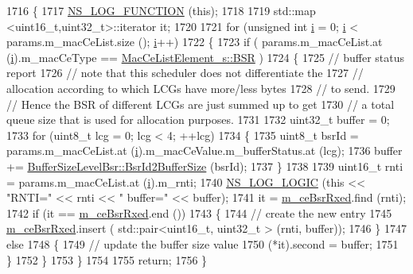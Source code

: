 \begin{DoxyCode}
1716 \{
1717   \hyperlink{log-macros-disabled_8h_a90b90d5bad1f39cb1b64923ea94c0761}{NS\_LOG\_FUNCTION} (\textcolor{keyword}{this});
1718 
1719   std::map <uint16\_t,uint32\_t>::iterator it;
1720 
1721   \textcolor{keywordflow}{for} (\textcolor{keywordtype}{unsigned} \textcolor{keywordtype}{int} \hyperlink{bernuolliDistribution_8m_a6f6ccfcf58b31cb6412107d9d5281426}{i} = 0; \hyperlink{bernuolliDistribution_8m_a6f6ccfcf58b31cb6412107d9d5281426}{i} < params.m\_macCeList.size (); \hyperlink{bernuolliDistribution_8m_a6f6ccfcf58b31cb6412107d9d5281426}{i}++)
1722     \{
1723       \textcolor{keywordflow}{if} ( params.m\_macCeList.at (\hyperlink{bernuolliDistribution_8m_a6f6ccfcf58b31cb6412107d9d5281426}{i}).m\_macCeType == \hyperlink{structns3_1_1MacCeListElement__s_a270a6526dfc7da02e9dc91823c290f6bac50796b01160b1825ec34efa1ad9f051}{MacCeListElement\_s::BSR} )
1724         \{
1725           \textcolor{comment}{// buffer status report}
1726           \textcolor{comment}{// note that this scheduler does not differentiate the}
1727           \textcolor{comment}{// allocation according to which LCGs have more/less bytes}
1728           \textcolor{comment}{// to send.}
1729           \textcolor{comment}{// Hence the BSR of different LCGs are just summed up to get}
1730           \textcolor{comment}{// a total queue size that is used for allocation purposes.}
1731 
1732           uint32\_t buffer = 0;
1733           \textcolor{keywordflow}{for} (uint8\_t lcg = 0; lcg < 4; ++lcg)
1734             \{
1735               uint8\_t bsrId = params.m\_macCeList.at (\hyperlink{bernuolliDistribution_8m_a6f6ccfcf58b31cb6412107d9d5281426}{i}).m\_macCeValue.m\_bufferStatus.at (lcg);
1736               buffer += \hyperlink{classns3_1_1BufferSizeLevelBsr_a67fc905f267ed8ac5a617fe229699122}{BufferSizeLevelBsr::BsrId2BufferSize} (bsrId);
1737             \}
1738           
1739           uint16\_t rnti = params.m\_macCeList.at (\hyperlink{bernuolliDistribution_8m_a6f6ccfcf58b31cb6412107d9d5281426}{i}).m\_rnti;
1740           \hyperlink{group__logging_ga88acd260151caf2db9c0fc84997f45ce}{NS\_LOG\_LOGIC} (\textcolor{keyword}{this} << \textcolor{stringliteral}{"RNTI="} << rnti << \textcolor{stringliteral}{" buffer="} << buffer);
1741           it = \hyperlink{classns3_1_1TdMtFfMacScheduler_a06bec792095027e46fcf5281e4f4e77a}{m\_ceBsrRxed}.find (rnti);
1742           \textcolor{keywordflow}{if} (it == \hyperlink{classns3_1_1TdMtFfMacScheduler_a06bec792095027e46fcf5281e4f4e77a}{m\_ceBsrRxed}.end ())
1743             \{
1744               \textcolor{comment}{// create the new entry}
1745               \hyperlink{classns3_1_1TdMtFfMacScheduler_a06bec792095027e46fcf5281e4f4e77a}{m\_ceBsrRxed}.insert ( std::pair<uint16\_t, uint32\_t > (rnti, buffer));
1746             \}
1747           \textcolor{keywordflow}{else}
1748             \{
1749               \textcolor{comment}{// update the buffer size value}
1750               (*it).second = buffer;
1751             \}
1752         \}
1753     \}
1754 
1755   \textcolor{keywordflow}{return};
1756 \}
\end{DoxyCode}



